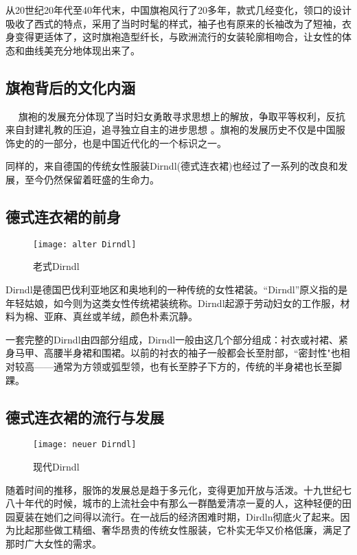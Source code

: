     从20世纪20年代至40年代末，中国旗袍风行了20多年，款式几经变化，领口的设计吸收了西式的特点，采用了当时时髦的样式，袖子也有原来的长袖改为了短袖，衣身变得更适体了，这时旗袍造型纤长，与欧洲流行的女装轮廓相吻合，让女性的体态和曲线美充分地体现出来了。 

\subsection{旗袍背后的文化内涵}

    旗袍的发展充分体现了当时妇女勇敢寻求思想上的解放，争取平等权利，反抗来自封建礼教的压迫，追寻独立自主的进步思想 。旗袍的发展历史不仅是中国服饰史的的一部分，也是中国近代化的一个标识之一。

    同样的，来自德国的传统女性服装Dirndl(德式连衣裙)也经过了一系列的改良和发展，至今仍然保留着旺盛的生命力。

\subsection{德式连衣裙的前身}
\begin{figure}[htb]
    \centering
    \texttt{[image: alter Dirndl]}
    \caption{老式Dirndl}
\end{figure}

    Dirndl是德国巴伐利亚地区和奥地利的一种传统的女性裙装。“Dirndl”原义指的是年轻姑娘，如今则为这类女性传统裙装统称。Dirndl起源于劳动妇女的工作服，材料为棉、亚麻、真丝或羊绒，颜色朴素沉静。 

    一套完整的Dirndl由四部分组成，Dirndl一般由这几个部分组成：衬衣或衬裙、紧身马甲、高腰半身裙和围裙。以前的衬衣的袖子一般都会长至肘部，“密封性"也相对较高——通常为方领或弧型领，也有长至脖子下方的，传统的半身裙也长至脚踝。 

\subsection{德式连衣裙的流行与发展}  
\begin{figure}[htb]
    \centering
    \texttt{[image: neuer Dirndl]}
    \caption{现代Dirndl}
\end{figure}

    随着时间的推移，服饰的发展总是趋于多元化，变得更加开放与活泼。十九世纪七八十年代的时候，城市的上流社会中有那么一群酷爱清凉一夏的人，这种轻便的田园夏装在她们之间得以流行。在一战后的经济困难时期，Dirdln彻底火了起来。因为比起那些做工精细、奢华昂贵的传统女性服装，它朴实无华又价格低廉，满足了那时广大女性的需求。

